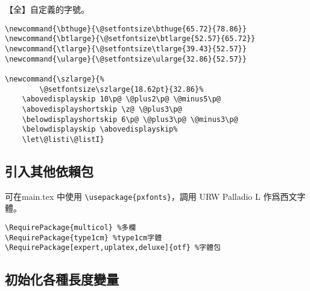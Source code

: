 \par 【全】自定義的字號。
\begin{lstlisting}[firstnumber=192]
\newcommand{\bthuge}{\@setfontsize\bthuge{65.72}{78.86}}
\newcommand{\btlarge}{\@setfontsize\btlarge{52.57}{65.72}}
\newcommand{\tlarge}{\@setfontsize\tlarge{39.43}{52.57}}
\newcommand{\ularge}{\@setfontsize\ularge{32.86}{52.57}}

\newcommand{\szlarge}{%
		\@setfontsize\szlarge{18.62pt}{32.86}%
  	\abovedisplayskip 10\p@ \@plus2\p@ \@minus5\p@
  	\abovedisplayshortskip \z@ \@plus3\p@
  	\belowdisplayshortskip 6\p@ \@plus3\p@ \@minus3\p@
   	\belowdisplayskip \abovedisplayskip%
   	\let\@listi\@listI}
\end{lstlisting}

\subsection{引入其他依賴包}
\par 可在main.tex 中使用 \verb+\usepackage{pxfonts}+，調用 URW Palladio L 作爲西文字體。
\begin{lstlisting}[firstnumber=205]
\RequirePackage{multicol} %多欄
\RequirePackage{type1cm} %type1cm字體
\RequirePackage[expert,uplatex,deluxe]{otf} %字體包
\end{lstlisting}

\subsection{初始化各種長度變量}

